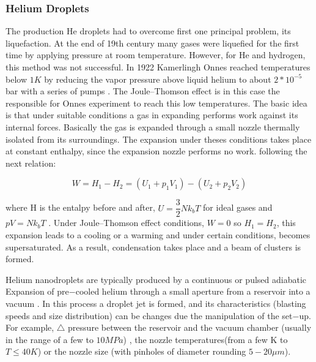 \subsubsection{Helium Droplets}

The production He droplets had to overcome first one principal problem, its liquefaction. At the end  of 19th century many gases were liquefied for the first time by applying pressure at room temperature. However, for He and hydrogen, this method was not successful. In 1922 Kamerlingh Onnes reached temperatures below $1K$ by reducing the vapor pressure above liquid helium to about $2*10^{-5}$ bar with a series of pumps \cite{van_delft_discovery_2010}. The Joule–Thomson effect \cite{weinberger_discovery_2013} is in this case the responsible for Onnes experiment to reach this low temperatures. The basic idea is that under suitable conditions a gas in expanding performs work against its internal forces. Basically the gas is expanded through a small nozzle thermally isolated from its surroundings. The expansion under theses conditions takes place at constant enthalpy, since the expansion nozzle performs no work. following the next relation:

\begin{equation}
W= H_{1}-H_{2} = (U_{1}+p_{1}V_{1})-(U_{2}+p_{2}V_{2})
\end{equation}

where H is the entalpy before and after, $U=\dfrac{3}{2}Nk_{b}T$ for ideal gases and $pV=Nk_{b}T$ \cite{enss_low-temperature_2005}. Under Joule–Thomson effect conditions, $W=0$ so $H_{1}=H_{2}$, this expansion leads to a cooling or a warming and under certain conditions, becomes supersaturated. As a result, condensation takes place and a beam of clusters is formed.

Helium nanodroplets are typically produced by a continuous or pulsed adiabatic Expansion of pre$-$cooled helium through a small aperture from a reservoir into a vacuum  \cite{stienkemeier_spectroscopy_2006}. In this process a droplet jet is formed, and its characteristics (blasting speeds and size distribution) can be changes due the manipulation of the set$-$up. For example, $\bigtriangleup$ pressure between the reservoir and the vacuum chamber (usually in the range of a few to $10MPa$) , the nozzle temperatures(from a few K to $T \leqslant 40K$) or the nozzle size (with pinholes of diameter rounding  $5-20 \mu m$).


